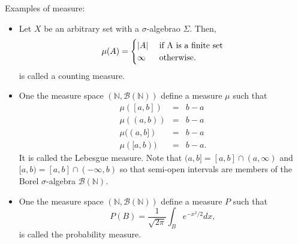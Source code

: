 \documentclass{article}
\newcommand{\son}{\mathbb{N}}
\theoremstyle{plain}
\numberwithin{thm}{section}
\theoremstyle{plain}
\numberwithin{prop}{section}
\theoremstyle{definition}
\numberwithin{defn}{section}
\theoremstyle{remark}
\numberwithin{equation}{section}
\begin{document}
Examples of measure:
\begin{itemize}
\item Let $X$ be an arbitrary set with a $\sigma$-algebrao $\Sigma$. Then,
\[
\mu(A) = \begin{cases} |A| & \text{ if } $A$ \text{ is a finite set} \\
\infty & \text{ otherwise.}
\end{cases}
\]
is called a counting measure.

\item One the measure space $(\son, \mathcal{B}(\son))$ define a 
measure $\mu$ such that
\begin{eqnarray*}
\mu([a, b]) &=& b - a \\
\mu((a, b)) &=& b - a \\
\mu((a, b]) &=& b - a \\
\mu([a, b)) &=& b - a.
\end{eqnarray*}
It is called the Lebesgue measure. Note that $(a, b] = [a, b] \cap (a, \infty)$
and $[a, b) = [a, b] \cap (-\infty, b)$ so that semi-open intervals are members
of the Borel $\sigma$-algebra $\mathcal{B}(\son)$.

\item One the measure space $(\son, \mathcal{B}(\son))$ define a 
measure $P$ such that
\[
P(B) = \frac{1}{\sqrt{2\pi}}\int_B e^{-x^2/2}dx,
\]
is called the probability measure.
\end{itemize}
\end{document}

